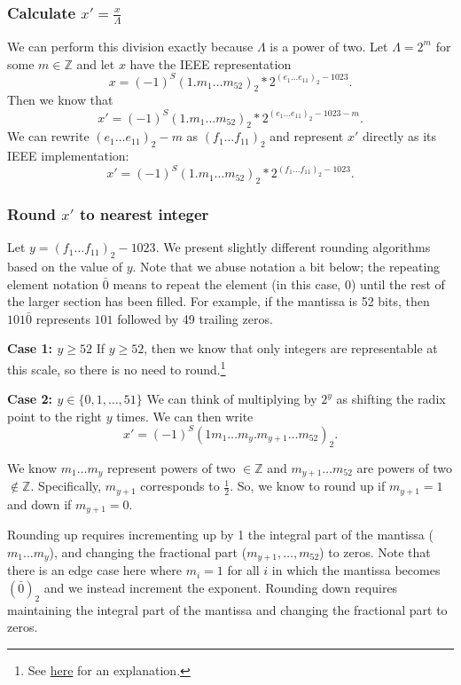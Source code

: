 \documentclass[11pt]{scrartcl} %
\begin{document}
\subsubsection{Calculate $x' = \frac{x}{\Lambda}$}
We can perform this division exactly because $\Lambda$ is a power of two. Let $\Lambda = 2^m$ for some $m \in \mathbb{Z}$ and let $x$ have the IEEE representation
\[ x = (-1)^S (1.m_{1} \hdots m_{52})_2 * 2^{(e_1 \hdots e_{11})_2-1023}. \]
Then we know that
\[ x' = (-1)^S (1.m_{1} \hdots m_{52})_2 * 2^{(e_1 \hdots e_{11})_2-1023-m}. \]
We can rewrite $(e_1 \hdots e_{11})_2 - m$ as $(f_1 \hdots f_{11})_2$ and represent $x'$ directly as its IEEE implementation:
\[ x' = (-1)^S (1.m_{1} \hdots m_{52})_2 * 2^{(f_1 \hdots f_{11})_2-1023}. \]

\subsubsection{Round $x'$ to nearest integer}
Let $y = (f_1 \hdots f_{11})_2-1023$. We present slightly different rounding algorithms based on the value of $y$. Note that we abuse notation a bit below; the repeating element notation $\bar{0}$ means to repeat the element (in this case, 0) until the rest of the larger section has been filled. For example, if the mantissa is 52 bits, then $101\bar{0}$ represents $101$ followed by 49 trailing zeros. \newline

\textbf{Case 1: $y \geq 52$}
If $y \geq 52$, then we know that only integers are representable at this scale, so there is no need to round.\footnote{See \href{https://www.exploringbinary.com/the-spacing-of-binary-floating-point-numbers/}{here} for an explanation.} \newline

\textbf{Case 2: $y \in \{0, 1, \hdots, 51\}$} \newline
We can think of multiplying by $2^y$ as shifting the radix point to the right $y$ times. We can then write
\[ x' = (-1)^S (1m_1 \hdots m_y.m_{y+1} \hdots m_{52})_2. \]

We know $m_1 \hdots m_y$ represent powers of two $\in \mathbb{Z}$ and $m_{y+1} \hdots m_{52}$ are powers of two $\not \in \mathbb{Z}$. Specifically, $m_{y+1}$ corresponds to $\frac{1}{2}$. So, we know to round up if $m_{y+1} = 1$ and down if $m_{y+1} = 0$. \newline

Rounding up requires incrementing up by 1 the integral part of the mantissa ($m_1 \hdots m_y$), and changing the fractional part ($m_{y+1}, \hdots, m_{52}$) to zeros. Note that there is an edge case here where $m_i = 1$ for all $i$ in which the mantissa becomes $(\bar{0})_2$ and we instead increment the exponent. Rounding down requires maintaining the integral part of the mantissa and changing the fractional part to zeros. \newline
\end{document}
